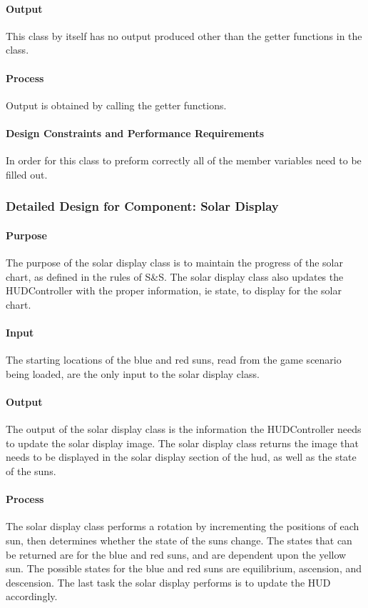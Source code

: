 \documentclass[12pt,a4paper,titlepage]{article}
\begin{document}
\paragraph{Output} This class by itself has no output produced other than the getter functions in the class.
\paragraph{Process} Output is obtained by calling the getter functions. 
\paragraph{Design Constraints and Performance Requirements} In order for this class to preform correctly all of the member variables need to be filled out.

\subsubsection{Detailed Design for Component: Solar Display}
\paragraph{Purpose} The purpose of the solar display class is to maintain the progress of the solar chart, as defined in the rules of S\&S. The solar display class also updates the HUDController with the proper information, ie state, to display for the solar chart.
\paragraph{Input} The starting locations of the blue and red suns, read from the game scenario being loaded, are the only input to the solar display class.
\paragraph{Output} The output of the solar display class is the information the HUDController needs to update the solar display image. The solar display class returns the image that needs to be displayed in the solar display section of the hud, as well as the state of the suns.
\paragraph{Process} The solar display class performs a rotation by incrementing the positions of each sun, then determines whether the state of the suns change. The states that can be returned are for the blue and red suns, and are dependent upon the yellow sun. The possible states for the blue and red suns are equilibrium, ascension, and descension. The last task the solar display performs is to update the HUD accordingly. 
\end{document}
